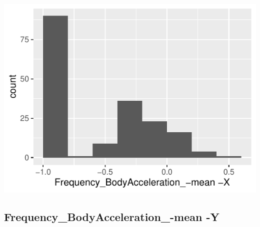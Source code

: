 \documentclass[
]{article}
\begin{document}
\begin{minipage}{0.25 \textwidth}

\includegraphics{codebook_tidydatasub_files/figure-latex/Var-43-Frequency-BodyAcceleration--mean--X-1.pdf}

\end{minipage}

\noindent\makebox[\linewidth]{\rule{\textwidth}{0.4pt}}

\hypertarget{frequency_bodyacceleration_-mean--y}{%
\subsection{Frequency\_BodyAcceleration\_-mean
-Y}\label{frequency_bodyacceleration_-mean--y}}
\end{document}
